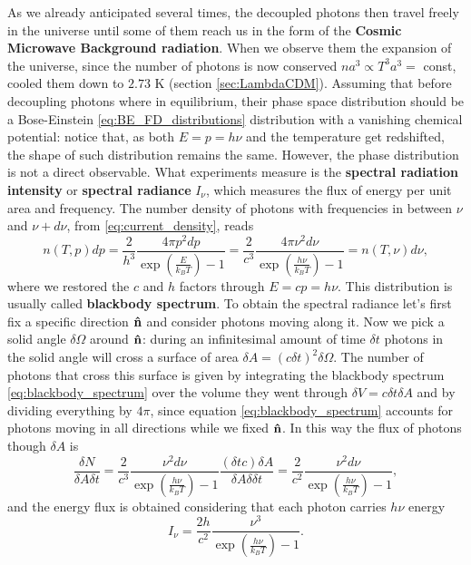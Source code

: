 As we already anticipated several times, the decoupled photons then travel freely in the universe until some of them reach us in the form of the \textbf{Cosmic Microwave Background radiation}. When we observe them the expansion of the universe, since the number of photons is now conserved $na^{3}\propto T^3a^{3}=$ const, cooled them down to $2.73$ K (section \ref{sec:LambdaCDM}). Assuming that before decoupling photons where in equilibrium, their phase space distribution should be a Bose-Einstein \eqref{eq:BE_FD_distributions} distribution with a vanishing chemical potential: notice that, as  both $E=p=h\nu$ and the temperature get redshifted, the shape of such distribution remains the same. However, the phase distribution is not a direct observable. What experiments measure is the \textbf{spectral radiation intensity} or \textbf{spectral radiance} $I_\nu$, which measures the flux of energy per unit area and frequency. The number density of photons with frequencies in between $\nu$ and $\nu+d\nu$, from \eqref{eq:current_density}, reads 
\begin{equation}
    \label{eq:blackbody_spectrum}
n(T,p)dp=\frac{2}{h^3}\frac{4\pi p^2dp}{\exp(\frac{E}{k_BT})-1}=\frac{2}{c^3}\frac{4\pi \nu^2d\nu}{\exp(\frac{h\nu}{k_BT})-1}=n(T,\nu)d\nu,
\end{equation}
where we restored the $c$ and $h$ factors through $E=cp=h\nu$. This distribution is usually called \textbf{blackbody spectrum}. To obtain the spectral radiance let's first fix a specific direction $\mathbf{\hat{n}}$ and consider photons moving along it. Now we pick a solid angle $\delta \Omega$ around $\mathbf{\hat{n}}$: during an infinitesimal amount of time $\delta t$ photons in the solid angle will cross a surface of area $\delta A = (c\delta t)^2\delta\Omega$. The number of photons that cross this surface is given by integrating the blackbody spectrum \eqref{eq:blackbody_spectrum} over the volume they went through $\delta V=c\delta t\delta A$ and by dividing everything by $4\pi$, since equation \eqref{eq:blackbody_spectrum} accounts for photons moving in all directions while we fixed $\mathbf{\hat{n}}$. In this way the flux of photons though $\delta A$ is
$$
\frac{\delta N}{\delta A\delta t}=\frac{2}{c^3}\frac{ \nu^2d\nu}{\exp(\frac{h\nu}{k_BT})-1}\frac{(\delta t c)\delta A}{\delta A \delta\delta t}=\frac{2}{c^2}\frac{\nu^2d\nu}{\exp(\frac{h\nu}{k_BT})-1},
$$
and the energy flux is obtained considering that each photon carries $h\nu$ energy
\begin{equation}
    I_\nu=\frac{2h}{c^2}\frac{\nu^3}{\exp(\frac{h\nu}{k_BT})-1}.
\end{equation}
